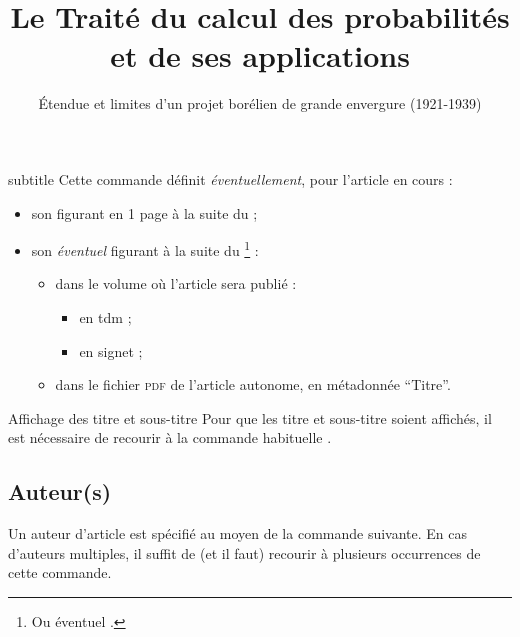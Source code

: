 \documentclass[french,nolocaltoc]{nwejmart}
\newtheorem[style=definition]{fait}
\newtheorem[title=expérience]{experience}
\newtheorem[title-plural=anneaux]{anneau}
\newtheorem[title=idéal,title-plural=idéaux]{ideal}
\begin{document}
\begin{docCommand}{subtitle}{}
  Cette commande définit \emph{éventuellement}, pour l'article en cours :
  \begin{itemize}
  \item son  figurant en 1\iere{} page à la suite
    du  ;
  \item son \emph{éventuel}  figurant à la suite du
    \footnote{Ou éventuel .} :
    \begin{itemize}
    \item dans le volume où l'article sera publié :
      \begin{itemize}
      \item en \gls{tdm} ;
      \item en signet ;
      \end{itemize}
    \item dans le fichier \textsc{pdf} de l'article autonome, en métadonnée
      \enquote{Titre}.
    \end{itemize}
  \end{itemize}
\end{docCommand}

\begin{bodycode}[listing options={deletekeywords={[2]title}}]
\title[Le Traité du calcul des probabilités]{Le Traité du calcul des
  probabilités et de ses applications}
\subtitle[Étendue et limites d'un projet borélien]{Étendue et limites
  d'un projet borélien de grande envergure (1921-1939)}
\end{bodycode}

\begin{dbremark}{Affichage des titre et sous-titre}{}
  Pour que les titre et sous-titre soient affichés, il est nécessaire de
  recourir à la commande habituelle .
\end{dbremark}

\subsection{Auteur(s)}
\label{sec-auteurs}

Un auteur d'article est spécifié au moyen de la commande 
suivante. En cas d'auteurs multiples, il suffit de (et il faut) recourir
à plusieurs occurrences de cette commande.
\end{document}
